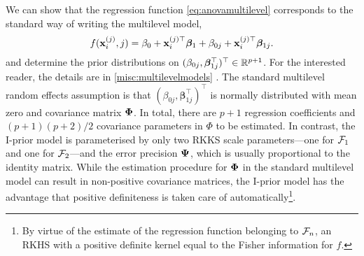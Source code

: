We can show that the regression function \cref{eq:anovamultilevel} corresponds to the standard way of writing the multilevel model, 
\begin{equation}\label{eq:standmultilevel}
  f({\mathbf x}_i^{(j)}, j) = \beta_0 + {\mathbf x}_i^{(j)\top}\boldsymbol{\beta}_1 + \beta_{0j} + {\mathbf x}_i^{(j)\top}\boldsymbol{\beta}_{1j}.   
\end{equation}
and determine the prior distributions on $(\beta_{0j},\boldsymbol{\beta}_{1j}^\top)^\top \in \mathbb{R}^{p+1}$.
For the interested reader, the details are in \cref{misc:multilevelmodels} .
The standard multilevel random effects assumption is that $(\beta_{0j},\boldsymbol{\beta}_{1j}^\top)^\top$ is normally distributed with mean zero and covariance matrix ${\bm\Phi}$.
In total, there are $p+1$ regression coefficients and $(p+1)(p+2)/2$ covariance parameters in $\Phi$ to be estimated.
In contrast, the I-prior model is parameterised by only two RKKS scale parameters---one for ${\mathcal F}_1$ and one for ${\mathcal F}_2$---and the error precision ${\bm\Psi}$, which is usually proportional to the identity matrix.
While the estimation procedure for ${\bm\Phi}$ in the standard multilevel model can result in non-positive covariance matrices, the I-prior model has the advantage that positive definiteness is taken care of automatically\footnote{By virtue of the estimate of the regression function belonging to ${\mathcal F}_n$, an RKHS with a positive definite kernel equal to the Fisher information for $f$.}.

